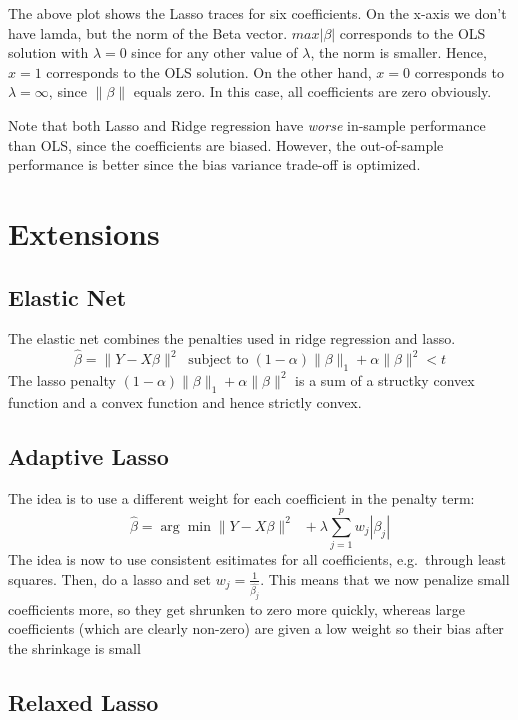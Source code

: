 \documentclass[]{book}
\begin{document}
The above plot shows the Lasso traces for six coefficients. On the
x-axis we don't have lamda, but the norm of the Beta vector.
\(max |\beta|\) corresponds to the OLS solution with \(\lambda = 0\)
since for any other value of \(\lambda\), the norm is smaller. Hence,
\(x = 1\) corresponds to the OLS solution. On the other hand, \(x = 0\)
corresponds to \(\lambda = \infty\), since \(\|\beta\|\) equals zero. In
this case, all coefficients are zero obviously.

Note that both Lasso and Ridge regression have \emph{worse} in-sample
performance than OLS, since the coefficients are biased. However, the
out-of-sample performance is better since the bias variance trade-off is
optimized.

\section{Extensions}\label{extensions}

\subsection{Elastic Net}\label{elastic-net}

The elastic net combines the penalties used in ridge regression and
lasso.
\[ \hat{\beta} =  \|Y- X\beta\|^2 \;\; \text{subject to}\; (1 - \alpha) \|\beta\|_1 + \alpha \|\beta\|^2 <t\]
The lasso penalty \((1 - \alpha) \|\beta\|_1 + \alpha \|\beta\|^2\) is a
sum of a structky convex function and a convex function and hence
strictly convex.

\subsection{Adaptive Lasso}\label{adaptive-lasso}

The idea is to use a different weight for each coefficient in the
penalty term:
\[ \hat{\beta} =  \arg\min\|Y- X\beta\|^2 \;\; + \lambda \sum\limits_{j = 1}^p w_j|\beta_j|\]
The idea is now to use consistent esitimates for all coefficients,
e.g.~through least squares. Then, do a lasso and set
\(w_j = \frac{1}{\hat{\beta_j}}\). This means that we now penalize small
coefficients more, so they get shrunken to zero more quickly, whereas
large coefficients (which are clearly non-zero) are given a low weight
so their bias after the shrinkage is small

\subsection{Relaxed Lasso}\label{relaxed-lasso}
\end{document}
